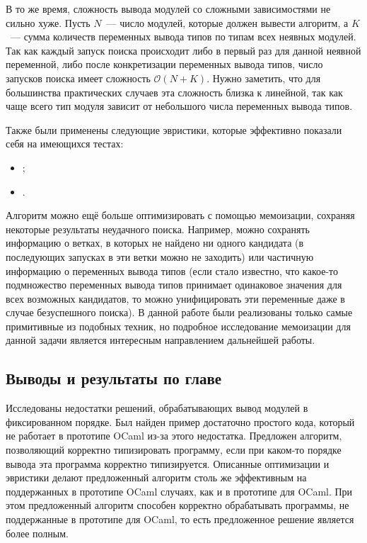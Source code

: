 \documentclass[../diploma.tex]{subfiles}
\begin{document}
В то же время, сложность вывода модулей со сложными зависимостями не сильно хуже. Пусть $N$~--- число модулей, которые должен вывести алгоритм, а $K$~--- сумма количеств переменных вывода типов по типам всех неявных модулей. Так как каждый запуск поиска происходит либо в первый раз для данной неявной переменной, либо после конкретизации переменных вывода типов, число запусков поиска имеет сложность $\mathcal{O}(N + K)$. Нужно заметить, что для большинства практических случаев эта сложность близка к линейной, так как чаще всего тип модуля зависит от небольшого числа переменных вывода типов.

Также были применены следующие эвристики, которые эффективно показали себя на имеющихся тестах:
\begin{itemize}
  \item ;
  \item .
\end{itemize}

Алгоритм можно ещё больше оптимизировать с помощью мемоизации, сохраняя некоторые результаты неудачного поиска. Например, можно сохранять информацию о ветках, в которых не найдено ни одного кандидата (в последующих запусках в эти ветки можно не заходить) или частичную информацию о переменных вывода типов (если стало известно, что какое-то подмножество переменных вывода типов принимает одинаковое значения для всех возможных кандидатов, то можно унифицировать эти переменные даже в случае безуспешного поиска). В данной работе были реализованы только самые примитивные из подобных техник, но подробное исследование мемоизации для данной задачи является интересным направлением дальнейшей работы.

\subsection{Выводы и результаты по главе}

Исследованы недостатки решений, обрабатывающих вывод модулей в фиксированном порядке. Был найден пример достаточно простого кода, который не работает в прототипе OCaml из-за этого недостатка. Предложен алгоритм, позволяющий корректно типизировать программу, если при каком-то порядке вывода эта программа корректно типизируется. Описанные оптимизации и эвристики делают предложенный алгоритм столь же эффективным на поддержанных в прототипе OCaml случаях, как и в прототипе для OCaml. При этом предложенный алгоритм способен корректно обрабатывать программы, не поддержанные в прототипе для OCaml, то есть предложенное решение является более полным.
\end{document}
